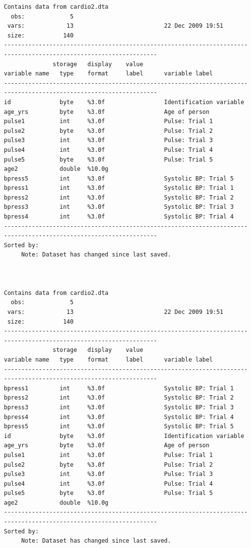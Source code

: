 \documentclass[
]{book}
\begin{document}
\begin{verbatim}
Contains data from cardio2.dta
  obs:             5                          
 vars:            13                          22 Dec 2009 19:51
 size:           140                          
------------------------------------------------------------------------------------------------------------------
              storage   display    value
variable name   type    format     label      variable label
------------------------------------------------------------------------------------------------------------------
id              byte    %3.0f                 Identification variable
age_yrs         byte    %3.0f                 Age of person
pulse1          int     %3.0f                 Pulse: Trial 1
pulse2          byte    %3.0f                 Pulse: Trial 2
pulse3          int     %3.0f                 Pulse: Trial 3
pulse4          int     %3.0f                 Pulse: Trial 4
pulse5          byte    %3.0f                 Pulse: Trial 5
age2            double  %10.0g                
bpress5         int     %3.0f                 Systolic BP: Trial 5
bpress1         int     %3.0f                 Systolic BP: Trial 1
bpress2         int     %3.0f                 Systolic BP: Trial 2
bpress3         int     %3.0f                 Systolic BP: Trial 3
bpress4         int     %3.0f                 Systolic BP: Trial 4
------------------------------------------------------------------------------------------------------------------
Sorted by: 
     Note: Dataset has changed since last saved.



Contains data from cardio2.dta
  obs:             5                          
 vars:            13                          22 Dec 2009 19:51
 size:           140                          
------------------------------------------------------------------------------------------------------------------
              storage   display    value
variable name   type    format     label      variable label
------------------------------------------------------------------------------------------------------------------
bpress1         int     %3.0f                 Systolic BP: Trial 1
bpress2         int     %3.0f                 Systolic BP: Trial 2
bpress3         int     %3.0f                 Systolic BP: Trial 3
bpress4         int     %3.0f                 Systolic BP: Trial 4
bpress5         int     %3.0f                 Systolic BP: Trial 5
id              byte    %3.0f                 Identification variable
age_yrs         byte    %3.0f                 Age of person
pulse1          int     %3.0f                 Pulse: Trial 1
pulse2          byte    %3.0f                 Pulse: Trial 2
pulse3          int     %3.0f                 Pulse: Trial 3
pulse4          int     %3.0f                 Pulse: Trial 4
pulse5          byte    %3.0f                 Pulse: Trial 5
age2            double  %10.0g                
------------------------------------------------------------------------------------------------------------------
Sorted by: 
     Note: Dataset has changed since last saved.
\end{verbatim}
\end{document}

